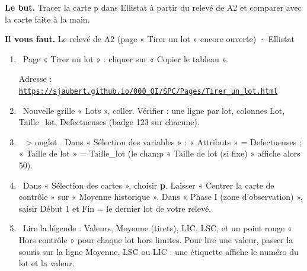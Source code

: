 \documentclass[10pt,a4paper]{article}
\begin{document}
\thispagestyle{fancy}
\begin{tcolorbox}[boite]\textbf{Le but.} Tracer la carte p dans Ellistat à partir du relevé de A2 et comparer avec la carte faite à la main.\par\textbf{Il vous faut.} Le relevé de A2 (page « Tirer un lot » encore ouverte) · Ellistat\end{tcolorbox}
\begin{enumerate}[label=\textcolor{cyan}{\textbf{\arabic*.}},leftmargin=15pt,itemsep=1.5pt]
\item \tagW\ Page « Tirer un lot » : cliquer sur « Copier le tableau ».\par Adresse : \href{https://sjaubert.github.io/000_OI/SPC/Pages/Tirer_un_lot.html}{\nolinkurl{https://sjaubert.github.io/000_OI/SPC/Pages/Tirer_un_lot.html}}
\item \tagE\ Nouvelle grille « Lots », coller. Vérifier : une ligne par lot, colonnes Lot, Taille\_lot, Defectueuses (badge 123 sur chacune).
\item \tagE\  > onglet . Dans « Sélection des variables » : « Attributs » = Defectueuses ; « Taille de lot » = Taille\_lot (le champ « Taille de lot (si fixe) » affiche alors 50).
\item \tagE\ Dans « Sélection des cartes », choisir \textbf{p}. Laisser « Centrer la carte de contrôle » sur « Moyenne historique ». Dans « Phase I (zone d'observation) », saisir Début 1 et Fin = le dernier lot de votre relevé.
\item \tagE\ Lire la légende : Valeurs, Moyenne (tirets), LIC, LSC, et un point rouge « Hors contrôle » pour chaque lot hors limites. Pour lire une valeur, passer la souris sur la ligne Moyenne, LSC ou LIC : une étiquette affiche le numéro du lot et la valeur.
\end{enumerate}
\par
\end{document}
